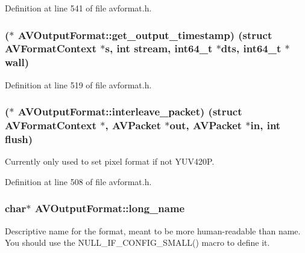 Definition at line 541 of file avformat.\+h.

\subsubsection[{\texorpdfstring{get\+\_\+output\+\_\+timestamp}{get_output_timestamp}}]{($\ast$ A\+V\+Output\+Format\+::get\+\_\+output\+\_\+timestamp) (struct {\bf A\+V\+Format\+Context} $\ast${\bf s}, {\bf int} stream, {\bf int64\+\_\+t} $\ast$dts, {\bf int64\+\_\+t} $\ast$wall)}\hypertarget{struct_a_v_output_format_a605bb6484d5da9f0ea9b129d438e353d}{}\label{struct_a_v_output_format_a605bb6484d5da9f0ea9b129d438e353d}


Definition at line 519 of file avformat.\+h.

\subsubsection[{\texorpdfstring{interleave\+\_\+packet}{interleave_packet}}]{($\ast$ A\+V\+Output\+Format\+::interleave\+\_\+packet) (struct {\bf A\+V\+Format\+Context} $\ast$, {\bf A\+V\+Packet} $\ast${\bf out}, {\bf A\+V\+Packet} $\ast${\bf in}, {\bf int} {\bf flush})}\hypertarget{struct_a_v_output_format_ab26b14e9f3c16220e8e8ce34b3a3fddc}{}\label{struct_a_v_output_format_ab26b14e9f3c16220e8e8ce34b3a3fddc}
Currently only used to set pixel format if not Y\+U\+V420P. 

Definition at line 508 of file avformat.\+h.

\subsubsection[{\texorpdfstring{long\+\_\+name}{long_name}}]{ char$\ast$ A\+V\+Output\+Format\+::long\+\_\+name}\hypertarget{struct_a_v_output_format_a4ff98d90aac0047a204a35a758a363fc}{}\label{struct_a_v_output_format_a4ff98d90aac0047a204a35a758a363fc}
Descriptive name for the format, meant to be more human-\/readable than name. You should use the N\+U\+L\+L\+\_\+\+I\+F\+\_\+\+C\+O\+N\+F\+I\+G\+\_\+\+S\+M\+A\+L\+L() macro to define it. 

